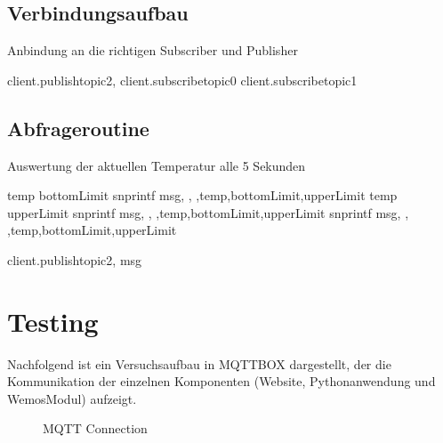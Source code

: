 \documentclass[a4paper,11pt,openany,oneside,ngerman]{sphinxmanual}
\begin{document}
\subsection{Verbindungsaufbau}
\label{\detokenize{wemos:verbindungsaufbau}}
Anbindung an die richtigen Subscriber und Publisher

\begin{sphinxVerbatim}[commandchars=\\\{\}]
client.publishtopic2, 
client.subscribetopic0
client.subscribetopic1
\end{sphinxVerbatim}


\subsection{Abfrageroutine}
\label{\detokenize{wemos:abfrageroutine}}
Auswertung der aktuellen Temperatur alle 5 Sekunden

\begin{sphinxVerbatim}[commandchars=\\\{\}]
 temp \PYGZlt{} bottomLimit 
    snprintf msg, , ,temp,bottomLimit,upperLimit
    temp \PYGZgt{} upperLimit
    snprintf msg, , ,temp,bottomLimit,upperLimit
   
    snprintf msg, , ,temp,bottomLimit,upperLimit

  client.publishtopic2, msg
\end{sphinxVerbatim}


\section{Testing}
\label{\detokenize{wemos:testing}}
Nachfolgend ist ein Versuchsaufbau in MQTTBOX dargestellt, der die Kommunikation
der einzelnen Komponenten (Website, Pythonanwendung und Wemos\sphinxhyphen{}Modul) aufzeigt.

\begin{figure}[htbp]
\centering
\capstart

\noindent{}
\caption{MQTT Connection}\label{\detokenize{wemos:mqtt-connection}}\end{figure}
\end{document}
